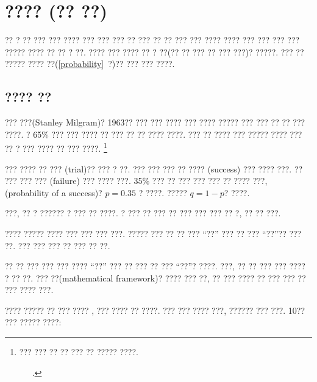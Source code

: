 

\section{???? (?? ??)}
\label{geomDist}

?? ? ?? ??? ??? ???? ??? ??? ??? ?? ???  ?? ?? ??? ??? ???? ???? ??? ??? ??? ??? ????? ???? ?? ?? ? ??. ???? ??? ???? ?? ? ??(?? ?? ??? ?? ??? ???)? ?????. ??? ?? ????? ???? ??(\ref{probability}~?)?? ??? ??? ????.

\subsection{???? ??}
\label{bernoulli}


??? ???(Stanley Milgram)? 1963?? ??? ??? ???? ??? ???? ????? ??? ??? ?? ?? ??? ????. ? 65\% ??? ??? ???? ?? ??? ?? ?? ???? ????. ??? ?? ???? ??? ????? ???? ??? ?? ? ??? ???? ?? ??? ????.
\footnote{??? ??? ?? ?? ??? ?? ????? ????.\par \ \ \hspace{0.2mm}\ .}

??? ???? ?? ??? (trial)?? ??? ? ??. ??? ??? ??? ?? ???? (success) ??? ???? ???. ?? ??? ??? ??? (failure) ??? ???? ???. 35\% ??? ?? ??? ??? ??? ?? ???? ???, (probability of a success)? $p=0.35$ ? ????. ????? $q=1-p$? ????.

???,  ?? ? ?????? ? ??? ?? ????. ? ??? ?? ??? ?? ??? ??? ??? ?? ?, ?? ?? ???.

\begin{termBox}{
???? ????? ???? ??? ??? ??? ???. ????? ??? ?? ?? ??? ``??'' ??? ?? ??? ``??''?? ??? ??. ???  ??? ??? ?? ??? ?? ??.}
\end{termBox}

\begin{tipBox}{
?? ?? ??? ??? ??? ???? ``??'' ??? ?? ??? ?? ??? ``??''? ????. ???, ?? ?? ??? ??? ???? ? ?? ??. ??? ??(mathematical framework)? ???? ??? ??, ?? ??? ???? ?? ??? ??? ?? ??? ???? ???.}
\end{tipBox}

???? ????? ?? ??? ???? , ??? ????  ?? ????. ??? ??? ???? ???, ?????? ??? ???. 10?? ??? ????? ????:

